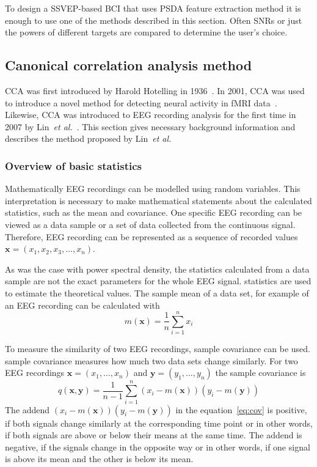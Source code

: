 To design a \gls{SSVEP}-based \gls{BCI} that uses \gls{PSDA} \gls{feature extraction} method it is enough to use one of the methods described in this section. Often \glspl{SNR} or just the powers of different \glspl{target} are compared to determine the user's choice.

\subsection{Canonical correlation analysis method}
\label{sec:CCA}

\Gls{CCA} was first introduced by Harold Hotelling in 1936~\cite{cca_hotelling}. In 2001, \gls{CCA} was used to introduce a novel method for detecting neural activity in \gls{fMRI} data~\cite{cca_fmri}. Likewise, \gls{CCA} was introduced to \gls{EEG} recording analysis for the first time in 2007 by Lin~\textit{et al.}~\cite{cca_lin}. This section gives necessary background information and describes the method proposed by Lin~\textit{et al.}

\subsubsection{Overview of basic statistics}

Mathematically \gls{EEG} recordings can be modelled using random variables. This interpretation is necessary to make mathematical statements about the calculated \glspl{statistic}, such as the \gls{mean} and \gls{covariance}. One specific \gls{EEG} recording can be viewed as a data \gls{sample} or a set of data collected from the continuous signal. Therefore, \gls{EEG} recording can be represented as a sequence of recorded values $\mathbf{x}=(x_1, x_2, x_3, \dots, x_n)$. 

As was the case with \gls{power spectral density}, the \glspl{statistic} calculated from a data \gls{sample} are not the exact parameters for the whole \gls{EEG} signal. \Glspl{statistic} are used to estimate the theoretical values. The \gls{sample} \gls{mean} of a data set, for example of an \gls{EEG} recording can be calculated with
\begin{equation}
	m(\mathbf{x}) = \frac{1}{n}\sum_{i=1}^{n}x_i
\end{equation}

To measure the similarity of two \gls{EEG} recordings, \gls{sample} \gls{covariance} can be used. \Gls{sample} \gls{covariance} measures how much two data sets change similarly. For two \gls{EEG} recordings $\mathbf{x}=(x_1,\dots,x_n)$ and $\mathbf{y}=(y_1, \dots, y_n)$ the \gls{sample} \gls{covariance} is
\begin{equation}
	\label{eq:cov}
	q(\mathbf{x},\mathbf{y}) = \frac{1}{n-1}\sum_{i=1}^{n}(x_i-m(\mathbf{x}))(y_i-m(\mathbf{y}))
\end{equation}
The addend $(x_i-m(\mathbf{x}))(y_i-m(\mathbf{y}))$ in the equation~\ref{eq:cov} is positive, if both signals change similarly at the corresponding time point or in other words, if both signals are above or below their \glspl{mean} at the same time. The addend is negative, if the signals change in the opposite way or in other words, if one signal is above its \gls{mean} and the other is below its \gls{mean}.

